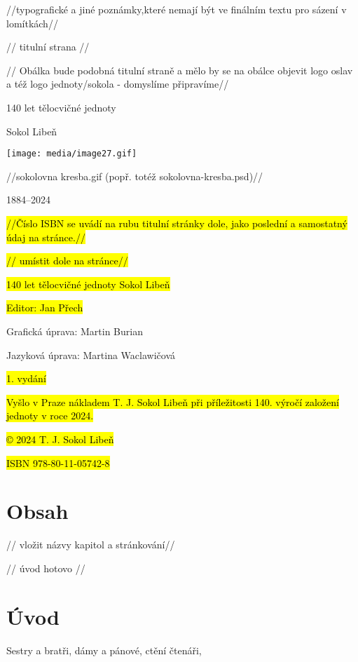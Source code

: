 //typografické a jiné poznámky,které nemají být ve finálním textu pro
sázení v lomítkách//

// titulní strana //

// Obálka bude podobná titulní straně a mělo by se na obálce objevit
logo oslav a též logo jednoty/sokola - domyslíme připravíme//

140 let tělocvičné jednoty

Sokol Libeň

\texttt{[image: media/image27.gif]}

//sokolovna kresba.gif (popř. totéž sokolovna-kresba.psd)//

1884--2024

\hl{//Číslo ISBN se uvádí na rubu titulní stránky dole, jako poslední a
samostatný údaj na stránce.//}

\hl{// umístit dole na stránce//}

\hl{140 let tělocvičné jednoty Sokol Libeň}

\hl{Editor: Jan Přech}

Grafická úprava: Martin Burian

Jazyková úprava: Martina Waclawičová

\hl{1. vydání}

\hl{Vyšlo v Praze nákladem T. J. Sokol Libeň při příležitosti 140.
výročí založení jednoty v roce 2024.}

\hl{© 2024 T. J. Sokol Libeň}

\hl{ISBN 978-80-11-05742-8}

\section{Obsah}\label{obsah}

// vložit názvy kapitol a stránkování//

// úvod hotovo //

\section{Úvod}\label{uxfavod}

Sestry a bratři, dámy a pánové, ctění čtenáři,

